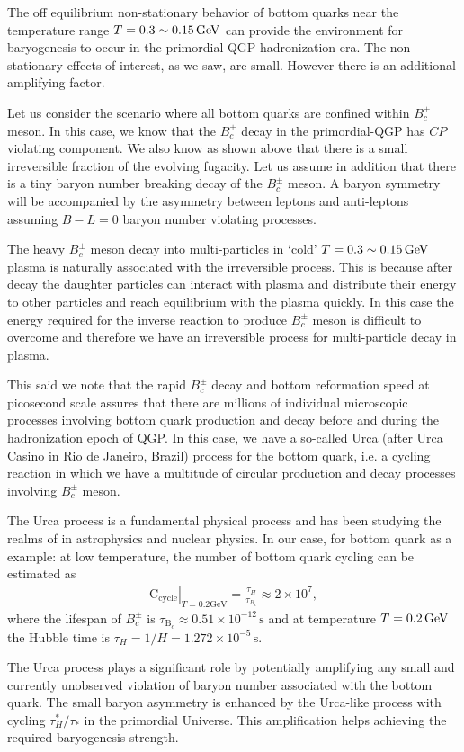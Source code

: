 The off equilibrium non-stationary behavior of bottom quarks near the temperature range $T=0.3\sim0.15\text{\,GeV}$ can provide the environment for baryogenesis to occur in the primordial-QGP hadronization era. The non-stationary effects of interest, as we saw, are small. However there is an additional amplifying factor. 
 
 Let us consider the scenario where all bottom quarks are confined within $B_c^\pm$ meson. In this case, we know that the $B_c^\pm$ decay in the primordial-QGP has $CP$ violating component. We also know as shown above that there is a small  irreversible fraction of the evolving fugacity. Let us assume in addition that  there is a tiny baryon number breaking decay of the $B^\pm_c$ meson. A baryon symmetry will be accompanied by the asymmetry between leptons and anti-leptons assuming $B-L=0$ baryon number violating processes.

The heavy $B_c^\pm$ meson decay into multi-particles in `cold' $T=0.3\sim0.15\text{\,GeV}$ plasma is  naturally associated with the irreversible process. This is because after decay the daughter particles can interact with plasma and distribute their energy to other particles and reach equilibrium with the plasma quickly. In this case the energy required for the inverse reaction to produce $B_c^\pm$ meson is difficult to overcome and therefore we have an irreversible process for multi-particle decay in plasma.

This said we note that the rapid $B_c^\pm$ decay and bottom reformation speed at picosecond scale assures that there are millions of individual microscopic processes involving bottom quark production and decay before and during the hadronization epoch of QGP. In this case, we have a so-called Urca (after Urca Casino in Rio de Janeiro, Brazil) process for the bottom quark, i.e. a cycling reaction in which we have a multitude of circular production and decay processes involving $B_c^\pm$ meson. 

The Urca process is a fundamental physical process and has been studying the realms of in astrophysics and nuclear physics. In our case, for bottom quark as a example: at low temperature, the number of bottom quark cycling can be estimated as
\begin{align}
\left.\mathrm{C_{cycle}}\right|_{T=0.2\mathrm{GeV}}=\frac{\tau_H}{\tau_{B_c}}\approx2\times10^7,
\end{align}
where the lifespan of $B_c^\pm$ is $\tau_{\mathrm{B}_c}\approx0.51\times10^{-12}\,\mathrm{s}$ and at temperature $T=0.2\text{\,GeV}$ the Hubble time is $\tau_H=1/H=1.272\times10^{-5}\,\mathrm{s}$. 

The Urca process plays a significant role by potentially amplifying any small and currently unobserved violation of baryon number associated with the bottom quark. The small baryon asymmetry is enhanced by the Urca-like process with cycling ${\tau^\ast_H}/{\tau_\ast}$ in the primordial Universe. This amplification helps achieving the required baryogenesis strength.
